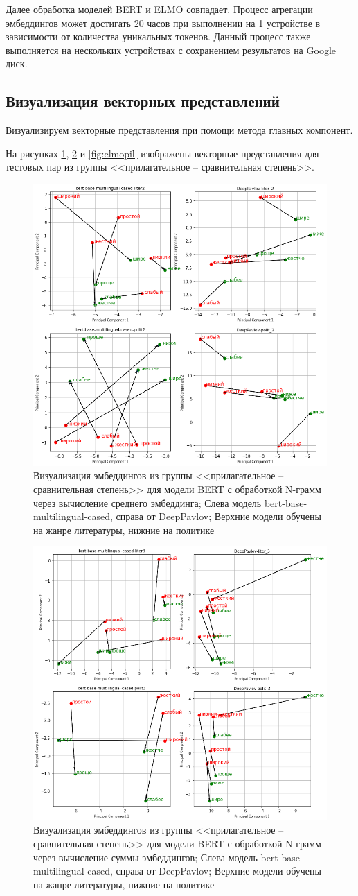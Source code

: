 \documentclass[a4paper,14pt]{article}
\begin{document}
Далее обработка моделей BERT и ELMO совпадает.
Процесс агрегации эмбеддингов может достигать 20 часов при выполнении на 1 устройстве в зависимости от количества уникальных токенов.
Данный процесс также выполняется на нескольких устройствах с сохранением результатов на Google диск.

\subsection{Визуализация векторных представлений}

Визуализируем векторные представления при помощи метода главных компонент.

На рисунках \ref{fig:pril2}, \ref{fig:pril3} и \ref{fig:elmopil} изображены векторные представления для тестовых пар из группы <<прилагательное -- сравнительная степень>>.

\begin{figure}[H]
	\centering
	\includegraphics[width=0.5\linewidth]{image/pril_2}
	\caption{Визуализация эмбеддингов из группы <<прилагательное -- сравнительная степень>> для модели BERT с обработкой N-грамм через вычисление среднего эмбеддинга; Слева модель bert-base-multilingual-cased, справа от DeepPavlov; Верхние модели обучены на жанре литературы, нижние на политике}
	\label{fig:pril2}
\end{figure}

\begin{figure}[H]
	\centering
	\includegraphics[width=0.5\linewidth]{image/pril_3}
	\caption{Визуализация эмбеддингов из группы <<прилагательное -- сравнительная степень>> для модели BERT с обработкой N-грамм через вычисление суммы эмбеддингов; Слева модель bert-base-multilingual-cased, справа от DeepPavlov; Верхние модели обучены на жанре литературы, нижние на политике}
	\label{fig:pril3}
\end{figure}
\end{document}
